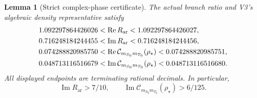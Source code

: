 \documentclass[11pt]{article}
\newtheorem{lemma}[lemma]{Lemma}
\theoremstyle{definition}
\theoremstyle{remark}
\begin{document}
\begin{lemma}[Strict complex-phase certificate]
\label{lem:v4-phase-certificate}
The actual branch ratio and V3's algebraic density representative satisfy
\begin{align}
 1.092297864426026&<\operatorname{Re}R_{\mathrm{ar}}
                  <1.092297864426027,\notag\\
 0.716248184244455&<\operatorname{Im}R_{\mathrm{ar}}
                  <0.716248184244456,
 \label{eq:v4-ratio-interval}\\
 0.074288820985750&<\operatorname{Re}\mathcal C_{m_{S_0}m_{T_0}}(\rho_\star)
                  <0.074288820985751,\notag\\
 0.048713116516679&<\operatorname{Im}\mathcal C_{m_{S_0}m_{T_0}}(\rho_\star)
                  <0.048713116516680.
 \label{eq:v4-coherence-interval}
\end{align}
All displayed endpoints are terminating rational decimals. In particular,
\begin{equation}
 \operatorname{Im}R_{\mathrm{ar}}>7/10,
 \qquad \operatorname{Im}\mathcal C_{m_{S_0}m_{T_0}}(\rho_\star)>6/125.
 \label{eq:v4-phase-margins}
\end{equation}
\end{lemma}
\end{document}
